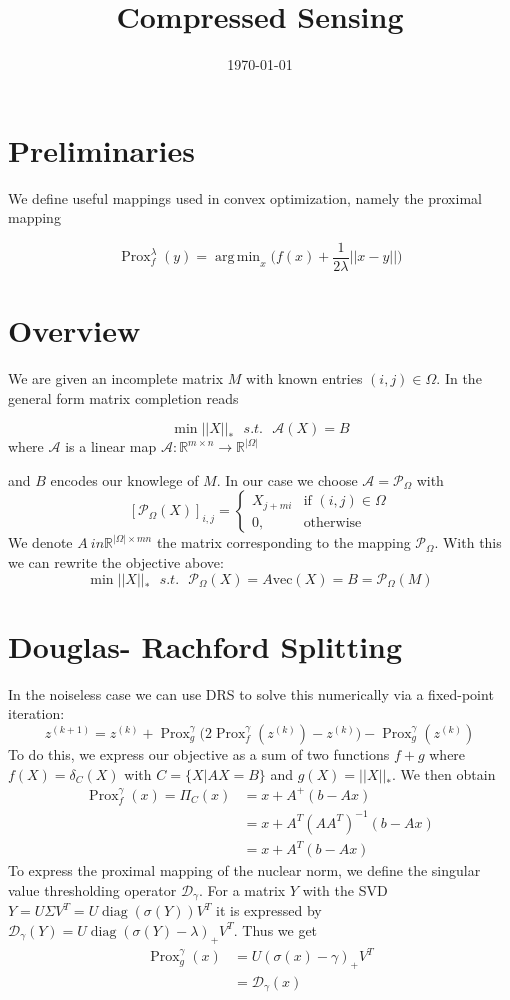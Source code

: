 \documentclass{article}
\title{Compressed Sensing}
\date{\today}
\numberwithin{equation}{section}
\DeclareMathOperator*{\argmin}{arg\,min}
\DeclareMathOperator{\Prox}{Prox}
\DeclareMathOperator{\diag}{diag}
\begin{document}
\maketitle

\section{Preliminaries}

We define useful mappings used in convex optimization, namely the proximal mapping

$$\Prox_f^\lambda(y) = \argmin_x \Big( f(x) + \frac{1}{2 \lambda} || x - y|| \Big)$$

\section{Overview}
We are given an incomplete matrix $M$ with known entries $(i,j) \in \Omega$. In the general form matrix completion reads

$$\min ||X||_* \ \ \ s. t. \ \ \ \mathcal{A}(X) = B$$
where $\mathcal{A}$ is a linear map $\mathcal{A}:\mathbb{R}^{m \times n} \longrightarrow \mathbb{R}^{|\Omega|}$

and $B$ encodes our knowlege of $M$.
In our case we choose $ \mathcal{A} = \mathcal{P}_\Omega$ with
$$
[\mathcal{P}_\Omega(X)]_{i,j}= 
\begin{cases}
    X_{j+mi} & \text{if } (i,j) \in \Omega\\
    0,              & \text{otherwise}
\end{cases}
$$
We denote $A \ in \mathbb{R}^{|\Omega| \times mn}$ the matrix corresponding to the mapping $\mathcal{P}_\Omega$. 
With this we can rewrite the objective above:
$$\min ||X||_* \ \ \ s. t. \ \ \ \mathcal{P}_\Omega(X) = A\text{vec}(X) = B = \mathcal{P}_\Omega(M)$$
\section{Douglas- Rachford Splitting}
In the noiseless case we can use DRS to solve this numerically via a fixed-point iteration: 
$$z^{(k+1)} = z^{(k)} + \Prox_{g}^\gamma\Big(2 \Prox_{f}^\gamma(z^{(k)}) - z^{(k)}\Big) - \Prox_{g}^\gamma(z^{(k)})$$
To do this, we express our objective as a sum of two functions $f + g$ where $f(X) = \delta_C(X)$ with $C = \lbrace X | AX = B \rbrace$ and $g(X) = ||X||_*$. We then obtain
\begin{align*}
\Prox_{f}^\gamma(x) = \Pi_C(x) &= x + A^+(b-Ax)
\\ &= x + A^T(A A^T)^{-1}(b - Ax)
\\ &= x + A^T(b-Ax)
\end{align*}
To express the proximal mapping of the nuclear norm, we define the singular value thresholding operator $\mathcal{D}_\gamma$. For a matrix $Y$ with the SVD
$Y = U \Sigma V^T = U \diag(\sigma(Y)) V^T$ it is expressed by $\mathcal{D}_\gamma (Y) = U \diag(\sigma(Y) - \lambda)_+ V^T$. Thus we get
\begin{align*}
\Prox_{g}^\gamma(x) &= U (\sigma(x) - \gamma)_{+} V^T
\\ &= \mathcal{D}_\gamma(x)
\end{align*}
\end{document}
